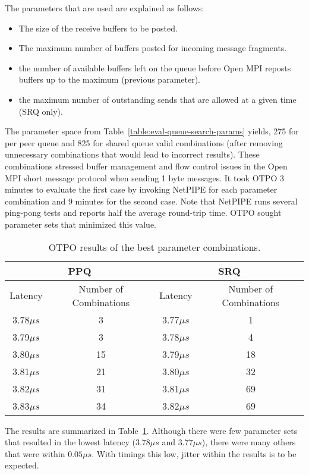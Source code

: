 The parameters that are used are explained as follows:\\
\begin{itemize}
\item The size of the receive buffers to be posted.
\item The maximum number of buffers posted for incoming message fragments.
\item the number of available buffers left on the queue before Open
  MPI reposts buffers up to the maximum (previous parameter).
\item the maximum number of outstanding sends that are allowed at a
  given time (SRQ only).
\end{itemize}

The parameter space from Table~\ref{table:eval-queue-search-params} yields,
275 for per peer queue and 825 for shared queue valid combinations (after
removing unnecessary combinations that would lead to incorrect
results). These combinations stressed buffer management and flow control
issues in the Open MPI short message protocol when sending 1 byte
messages. It took OTPO 3 minutes to evaluate the first
case by invoking NetPIPE for each parameter combination and 9 minutes for the second case.  
Note that NetPIPE runs several ping-pong tests and reports half the average round-trip time. OTPO sought parameter sets that minimized this value.

\begin{table}[tb]
\centering
\caption{OTPO results of the best parameter combinations.}
\label{table:results} 
\begin{tabular}{|c|c||c|c|} 
\hline
\multicolumn{2}{|c|}{PPQ} & \multicolumn{2}{|c|}{SRQ} \\
\hline
Latency & Number of Combinations & Latency & Number of Combinations\\
\hline
3.78$\mu s$  & 3& 3.77$\mu s$  & 1\\ 
\hline		  
3.79$\mu s$  & 3 & 3.78$\mu s$  & 4\\ 
\hline		  
3.80$\mu s$  & 15 & 3.79$\mu s$  & 18\\
\hline
3.81$\mu s$  & 21 & 3.80$\mu s$  & 32\\
\hline		  
3.82$\mu s$  & 31 &3.81$\mu s$  & 69\\
\hline		   
3.83$\mu s$  & 34 & 3.82$\mu s$  & 69\\
\hline
\end{tabular}  
\end{table}


The results are summarized in Table~\ref{table:results}. Although there were few parameter sets that
resulted in the lowest latency ($3.78\mu s$ and $3.77\mu s$), there were many
others that were within $0.05\mu s$.  With timings this low, jitter within the
results is to be expected.

